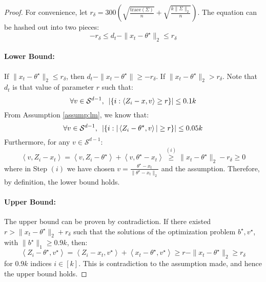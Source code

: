 \documentclass{article}
\theoremstyle{remark}
\theoremstyle{defintiion}
\newcommand{\inner}[2]{\left\langle #1, #2 \right\rangle}
\newcommand{\trace}{\mathrm{trace}}
\newcommand{\tparam}{\theta^{\star}}
\newcommand{\calS}{\mathcal{S}}
\begin{document}
\begin{proof}
For convenience, let \(r_{\delta} = 300\left(\sqrt{\frac{\trace(\Sigma)}{n}} + \sqrt{\frac{k\|\Sigma\|_{2}}{n}}\right)\).
The equation can be hashed out into two pieces:
\begin{equation*}
-r_{\delta} \leq d_{t} - \|x_{t} - \tparam\|_{2} \leq r_{\delta}
\end{equation*}

\paragraph{Lower Bound:} If \(\|x_{t} - \tparam\|_{2} \leq r_{\delta}\), then \(d_{t} - \|x_{t} - \tparam\| \geq -r_{\delta}\). If \(\|x_{t} - \tparam\|_{2} > r_{\delta}\). Note that \(d_{t}\) is that value of parameter \(r\) such that:
\begin{equation*}
\forall v \in \calS^{d-1}, \enskip \left|\{i : \inner{Z_{i} - x}{v} \geq r\}\right| \leq 0.1k
\end{equation*}
From Assumption \ref{assump:lm}, we know that:
\begin{equation*}
\forall v \in \calS^{d-1}, \enskip \left|\{i : |\inner{Z_{i} - \tparam}{v}| \geq r\}\right| \leq 0.05k
\end{equation*}
Furthermore, for any \(v \in \calS^{d-1}\):
\begin{equation*}
\inner{v}{Z_{i} - x_{t}} = \inner{v}{Z_{i} - \tparam} + \inner{v}{\tparam - x_{t}} \overset{(i)}\geq \|x_{t} - \tparam\|_{2} - r_{\delta} \geq 0
\end{equation*}
where in Step \((i)\) we have chosen \(v = \frac{\tparam - x_{t}}{\|\tparam - x_{t}\|_{2}}\) and the assumption. Therefore, by definition, the lower bound holds.

\paragraph{Upper Bound:} The upper bound can be proven by contradiction. If there existed \(r > \|x_{t} - \tparam\|_{2} + r_{\delta}\) such that the solutions of the optimization problem \(b^{\star}, v^{\star}\), with \(\|b^{\star}\|_{1} \geq 0.9k\), then:
\begin{equation*}
\inner{Z_{i} - \tparam}{v^{\star}} = \inner{Z_{i} - x_{t}}{v^{\star}} + \inner{x_{t} - \tparam}{v^{\star}} \geq r - \|x_{t} - \tparam\|_{2} \geq r_{\delta}
\end{equation*}
for \(0.9k\) indices \(i \in [k]\). This is contradiction to the assumption made, and hence the upper bound holds.
\end{proof}
\end{document}
